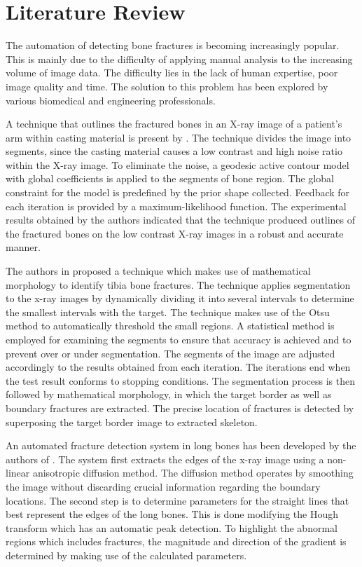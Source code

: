 \documentclass[11pt,twocolumn]{witseiepaper}
\begin{document}
	\section{Literature Review}
	The automation of detecting bone fractures is becoming increasingly popular. This is mainly due to the difficulty of applying manual analysis to the increasing volume of image data. The difficulty lies in the lack of human expertise, poor image quality and time. The solution to this problem has been explored by various biomedical and engineering professionals. 
	
	A technique that outlines the fractured bones in an X-ray image of a patient's arm within casting material is present by \cite{Jia_Jiang2006}. The technique divides the image into segments, since the casting material causes a low contrast and high noise ratio within the X-ray image. To eliminate the noise, a geodesic active contour model with global coefficients is applied to the segments of bone region. The global constraint for the model is predefined by the prior shape collected. Feedback for each iteration is provided by a maximum-likelihood function. The experimental results obtained by the authors indicated that the technique produced outlines of the fractured bones on the low contrast X-ray images in a robust and accurate manner.
	
	The authors in \cite{Liang_Pan_Huang_Fan_2010} proposed a technique which makes use of mathematical morphology to identify tibia bone fractures. The technique applies segmentation to the x-ray images by dynamically dividing it into several intervals to determine the smallest intervals with the target. The technique makes use of the Otsu method to automatically threshold the small regions. A statistical method is employed for examining the segments to ensure that accuracy is achieved and to prevent over or under segmentation. The segments of the image are adjusted accordingly to the results obtained from each iteration. The iterations end when the test result conforms to stopping conditions. The segmentation process is then followed by mathematical morphology, in which the target border as well as boundary fractures are extracted. The precise location of fractures is detected by superposing the target border image to extracted skeleton.
	
	An automated fracture detection system in long bones has been developed by the authors of \cite{Donnelley2005}. The system first extracts the edges of the x-ray image using a non-linear anisotropic diffusion method. The diffusion method operates by smoothing the image without discarding crucial information regarding the boundary locations. The second step is to determine parameters for the straight lines that best represent the edges of the long bones. This is done modifying the Hough transform which has an automatic peak detection. To highlight the abnormal regions which includes fractures, the magnitude and direction of the gradient is determined by making use of the calculated parameters.
	
\end{document}

